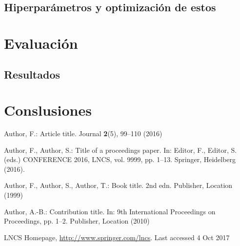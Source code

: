 \documentclass[runningheads]{llncs}
\begin{document}
\subsection{Hiperparámetros y optimización de estos}

\section{Evaluación}

\subsection{Resultados}

\section{Conslusiones}


\begin{thebibliography}{8}
Author, F.: Article title. Journal \textbf{2}(5), 99--110 (2016)

Author, F., Author, S.: Title of a proceedings paper. In: Editor,
F., Editor, S. (eds.) CONFERENCE 2016, LNCS, vol. 9999, pp. 1--13.
Springer, Heidelberg (2016). 

Author, F., Author, S., Author, T.: Book title. 2nd edn. Publisher,
Location (1999)

Author, A.-B.: Contribution title. In: 9th International Proceedings
on Proceedings, pp. 1--2. Publisher, Location (2010)

LNCS Homepage, \url{http://www.springer.com/lncs}. Last accessed 4
Oct 2017
\end{thebibliography}
\end{document}

